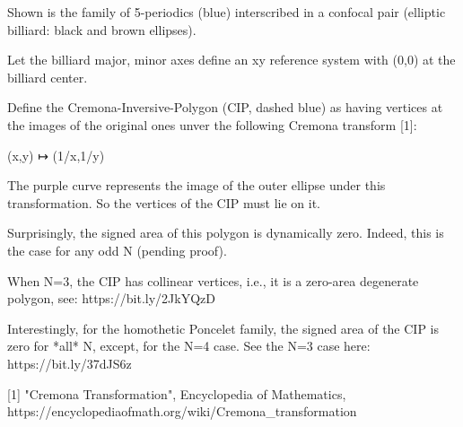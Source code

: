 Shown is the family of 5-periodics (blue) interscribed in a confocal pair (elliptic billiard: black and brown ellipses).

Let the billiard major, minor axes define an xy reference system with (0,0) at the billiard center.

Define the Cremona-Inversive-Polygon (CIP, dashed blue) as having vertices at the images of the original ones unver the following Cremona transform [1]:

(x,y) ↦ (1/x,1/y)

The purple curve represents the image of the outer ellipse under this transformation. So the vertices of the CIP must lie on it.

Surprisingly, the signed area of this polygon is dynamically zero. Indeed, this is the case for any odd N (pending proof).

When N=3, the CIP has collinear vertices, i.e., it is a zero-area degenerate polygon, see: https://bit.ly/2JkYQzD

Interestingly, for the homothetic Poncelet family, the signed area of the CIP is zero for *all* N, except, for the N=4 case. See the N=3 case here: https://bit.ly/37dJS6z 

[1] "Cremona Transformation", Encyclopedia of Mathematics, https://encyclopediaofmath.org/wiki/Cremona_transformation